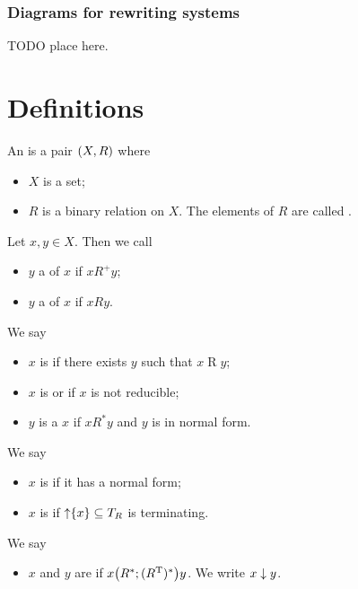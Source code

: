 \subsubsection{Diagrams for rewriting systems}
TODO place here.


\section{Definitions}
\begin{definition}
An  is a pair $\left( X, R \right)$ where
\begin{itemize}
\item $X$ is a set;
\item $R$ is a binary relation on $X$. The elements of $R$ are called .
\end{itemize}
Let $x,y\in X$. Then we call
\begin{itemize}
\item $y$ a  of $x$ if $xR^+y$;
\item $y$ a  of $x$ if $xRy$.
\end{itemize}
We say
\begin{itemize}
\item $x$ is  if there exists $y$ such that $x\mathrel{R}y$;
\item $x$ is  or  if $x$ is not reducible;
\item $y$ is a  $x$ if $xR^*y$ and $y$ is in normal form.
\end{itemize}
We say
\begin{itemize}
\item $x$ is  if it has a normal form;
\item $x$ is  if $\operatorname{\uparrow}\{x\} \subseteq T_R$ is terminating.
\end{itemize}
We say
\begin{itemize}
\item $x$ and $y$ are  if $x\big(R^*;(R^{\mathrm{T}})^*\big)y$. We write $x \mathrel{\downarrow} y$.
\end{itemize}
\end{definition}


